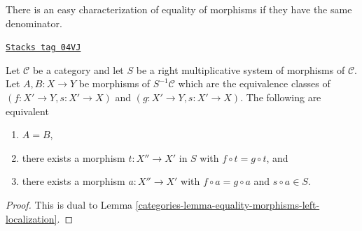 There is an easy characterization of equality of morphisms if they
have the same denominator.

\begin{lemma}
\label{categories-lemma-equality-morphisms-right-localization}
\href{https://stacks.math.columbia.edu/tag/04VJ}{\texttt{Stacks tag 04VJ}}

Let $\mathcal{C}$ be a category and let $S$ be a right multiplicative
system of morphisms of $\mathcal{C}$. Let $A, B : X \to Y$ be
morphisms of $S^{-1}\mathcal{C}$ which are the equivalence
classes of $(f : X' \to Y, s : X' \to X)$ and
$(g : X' \to Y, s : X' \to X)$. The following are equivalent
\begin{enumerate}
\item $A = B$,
\item there exists a morphism $t : X'' \to X'$ in $S$ with
$f \circ t = g \circ t$, and
\item there exists a morphism $a : X'' \to X'$ with
$f \circ a = g \circ a$ and $s \circ a \in S$.
\end{enumerate}
\end{lemma}

\begin{proof}

This is dual to
Lemma \ref{categories-lemma-equality-morphisms-left-localization}.
\end{proof}

